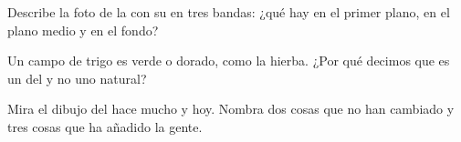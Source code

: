 \begin{exercise}[$\star\star$]\label{exo:g1:landscapes-around-us:9}
Describe la foto de la  con su  en tres bandas: ¿qué hay en el
primer plano, en el plano medio y en el fondo?
\end{exercise}

\begin{exercise}[$\star\star$]\label{exo:g1:landscapes-around-us:10}
Un campo de trigo es verde o dorado, como la hierba. ¿Por qué decimos que es
un  del  y no uno natural?
\end{exercise}

\begin{exercise}[$\star\star$]\label{exo:g1:landscapes-around-us:11}
Mira el dibujo del  hace mucho y hoy. Nombra dos cosas que no han
cambiado y tres cosas que ha añadido la gente.
\end{exercise}
